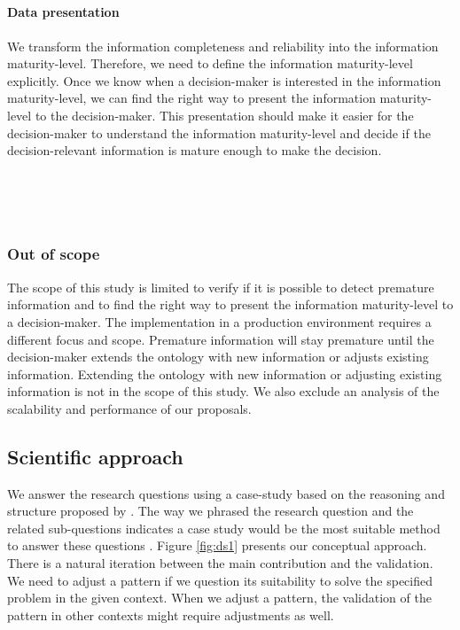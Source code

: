 \begin{center}
\large\color{document}{\rqdsone} \\[0.3cm]
\large\color{document}{\rqdstwo} \\[0.3cm]
\large\color{document}{\rqdsthree} \\
\end{center}

\paragraph{Data presentation}
We transform the information completeness and reliability into the information maturity-level. Therefore, we need to define the information maturity-level explicitly. Once we know when a decision-maker is interested in the information maturity-level, we can find the right way to present the information maturity-level to the decision-maker. This presentation should make it easier for the decision-maker to understand the information maturity-level and decide if the decision-relevant information is mature enough to make the decision.

\begin{center}
\large\color{document}{\rqvisone} \\[0.3cm]
\large\color{document}{\rqvistwo} \\[0.3cm]
\large\color{document}{\rqvisthree} \\
\end{center}

\subsubsection{Out of scope}
The scope of this study is limited to verify if it is possible to detect premature information and to find the right way to present the information maturity-level to a decision-maker. The implementation in a production environment requires a different focus and scope. Premature information will stay premature until the decision-maker extends the ontology with new information or adjusts existing information. Extending the ontology with new information or adjusting existing information is not in the scope of this study. We also exclude an analysis of the scalability and performance of our proposals.

\subsection{Scientific approach} \label{meth_sa}
We answer the research questions using a case-study based on the reasoning and structure proposed by \cite{THE08}. The way we phrased the research question and the related sub-questions indicates a case study would be the most suitable method to answer these questions \parencite{BK06}. Figure \ref{fig:ds1} presents our conceptual approach. There is a natural iteration between the main contribution and the validation. We need to adjust a pattern if we question its suitability to solve the specified problem in the given context. When we adjust a pattern, the validation of the pattern in other contexts might require adjustments as well.

